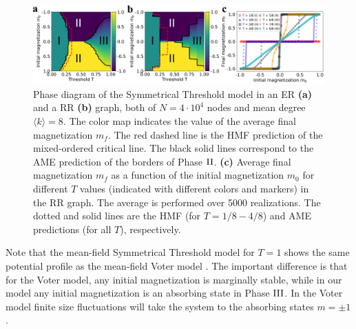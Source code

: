 \begin{figure}
	\centering \captionsetup{font=sf}
	\includegraphics[width=\linewidth]{Figs/Aging_STM/FIG2.pdf}
	\caption[Phase diagram in random networks]{\label{ER_REG_PD} Phase diagram of the Symmetrical Threshold model in an ER \textbf{(a)} and a RR \textbf{(b)} graph, both of $N=4\cdot10^4$ nodes and mean degree $\langle k \rangle=8$. The color map indicates the value of the average final magnetization $m_f$. The red dashed line is the HMF prediction of the mixed-ordered critical line. The black solid lines correspond to the AME prediction of the borders of Phase ${\rm II}$. \textbf{(c)} Average final magnetization $m_f$ as a function of the initial magnetization $m_0$ for different $T$ values (indicated with different colors and markers) in the RR graph. The average is performed over 5000 realizations. The dotted and solid lines are the HMF (for $T=1/8 - 4/8$) and AME predictions (for all $T$), respectively.}
\end{figure}


Note that the mean-field Symmetrical Threshold model for $T=1$ shows the same potential profile as the mean-field Voter model \cite{Suchecki-2005, Voter-original, Voter}. The important difference is that for the Voter model, any initial magnetization is marginally stable, while in our model any initial magnetization is an absorbing state in Phase ${\rm III}$. In the Voter model finite size fluctuations will take the system to the absorbing states $m=\pm 1$. 


